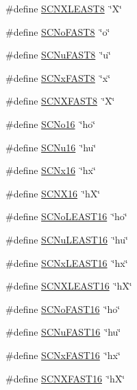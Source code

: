 \begin{DoxyCompactItemize}
\#define \hyperlink{a00113_ab76cc2e4fdc08d6b8bfbdb7353ac1dbb}{S\+C\+N\+X\+L\+E\+A\+S\+T8}~\char`\"{}X\char`\"{}
\item 
\#define \hyperlink{a00113_a9716b5135de22733c9c59bc4fc0e3a66}{S\+C\+No\+F\+A\+S\+T8}~\char`\"{}o\char`\"{}
\item 
\#define \hyperlink{a00113_a01b368195aa26130d44bf0efe07833fd}{S\+C\+Nu\+F\+A\+S\+T8}~\char`\"{}u\char`\"{}
\item 
\#define \hyperlink{a00113_a251936e4d698e68846c0917270b5f8a5}{S\+C\+Nx\+F\+A\+S\+T8}~\char`\"{}x\char`\"{}
\item 
\#define \hyperlink{a00113_a804436b52bc244973b05478871d07b93}{S\+C\+N\+X\+F\+A\+S\+T8}~\char`\"{}X\char`\"{}
\item 
\#define \hyperlink{a00113_a9bc6b517c0117327e832824ff2d6a6b5}{S\+C\+No16}~\char`\"{}ho\char`\"{}
\item 
\#define \hyperlink{a00113_a37bbde0e3f124b7f482d54adb13b0248}{S\+C\+Nu16}~\char`\"{}hu\char`\"{}
\item 
\#define \hyperlink{a00113_a12dbc2ac6a36b893ef1c25c357f90a9f}{S\+C\+Nx16}~\char`\"{}hx\char`\"{}
\item 
\#define \hyperlink{a00113_a0c139165956b5fba7b44bd35cfafc86d}{S\+C\+N\+X16}~\char`\"{}hX\char`\"{}
\item 
\#define \hyperlink{a00113_a5b05c70b4807922992a9ca529361b44d}{S\+C\+No\+L\+E\+A\+S\+T16}~\char`\"{}ho\char`\"{}
\item 
\#define \hyperlink{a00113_a7a78b92618044bb2d798b57fc6a2e439}{S\+C\+Nu\+L\+E\+A\+S\+T16}~\char`\"{}hu\char`\"{}
\item 
\#define \hyperlink{a00113_a24647dd309d4138846376a51a6098304}{S\+C\+Nx\+L\+E\+A\+S\+T16}~\char`\"{}hx\char`\"{}
\item 
\#define \hyperlink{a00113_a253d5fe947676317064837c266c8f724}{S\+C\+N\+X\+L\+E\+A\+S\+T16}~\char`\"{}hX\char`\"{}
\item 
\#define \hyperlink{a00113_a021e130b06fc46198c71dca0fdf89788}{S\+C\+No\+F\+A\+S\+T16}~\char`\"{}ho\char`\"{}
\item 
\#define \hyperlink{a00113_a7cf58abc57bb03d809e6fc41c2a40c33}{S\+C\+Nu\+F\+A\+S\+T16}~\char`\"{}hu\char`\"{}
\item 
\#define \hyperlink{a00113_a8b67140c216180e4e5d18003038ee689}{S\+C\+Nx\+F\+A\+S\+T16}~\char`\"{}hx\char`\"{}
\item 
\#define \hyperlink{a00113_ad2ce48bc4e534a0e1702a6851cd31d41}{S\+C\+N\+X\+F\+A\+S\+T16}~\char`\"{}hX\char`\"{}
\item 

\end{DoxyCompactItemize}
